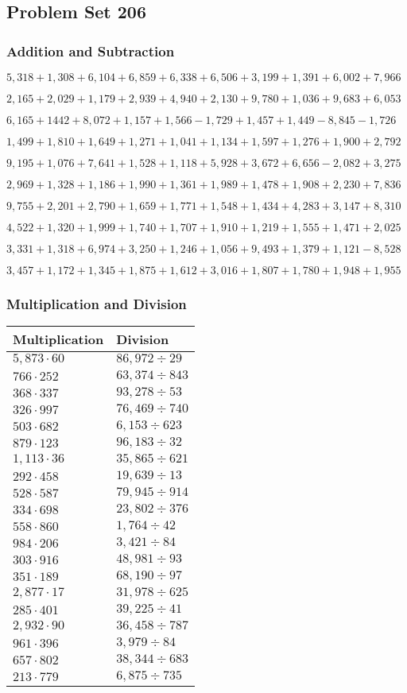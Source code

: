 \hypertarget{problem-set-206}{%
\subsection{Problem Set 206}\label{problem-set-206}}

\hypertarget{addition-and-subtraction}{%
\subsubsection{Addition and
Subtraction}\label{addition-and-subtraction}}

\(5,318+1,308+6,104+6,859+6,338+6,506+3,199+1,391+6,002+7,966\)

\(2,165+2,029+1,179+2,939+4,940+2,130+9,780+1,036+9,683+6,053\)

\(6,165+1442+8,072+1,157+1,566-1,729+1,457+1,449-8,845-1,726\)

\(1,499+1,810+1,649+1,271+1,041+1,134+1,597+1,276+1,900+2,792\)

\(9,195+1,076+7,641+1,528+1,118+5,928+3,672+6,656-2,082+3,275\)

\(2,969+1,328+1,186+1,990+1,361+1,989+1,478+1,908+2,230+7,836\)

\(9,755+2,201+2,790+1,659+1,771+1,548+1,434+4,283+3,147+8,310\)

\(4,522+1,320+1,999+1,740+1,707+1,910+1,219+1,555+1,471+2,025\)

\(3,331+1,318+6,974+3,250+1,246+1,056+9,493+1,379+1,121-8,528\)

\(3,457+1,172+1,345+1,875+1,612+3,016+1,807+1,780+1,948+1,955\)

\hypertarget{multiplication-and-division}{%
\subsubsection{Multiplication and
Division}\label{multiplication-and-division}}

\begin{longtable}[]{@{}ll@{}}
\toprule
Multiplication & Division\tabularnewline
\midrule
\endhead
\(5,873\cdot60\) & \(86,972÷29\)\tabularnewline
\(766\cdot252\) & \(63,374÷843\)\tabularnewline
\(368\cdot337\) & \(93,278÷53\)\tabularnewline
\(326\cdot997\) & \(76,469÷740\)\tabularnewline
\(503\cdot682\) & \(6,153÷623\)\tabularnewline
\(879\cdot123\) & \(96,183÷32\)\tabularnewline
\(1,113\cdot36\) & \(35,865÷621\)\tabularnewline
\(292\cdot458\) & \(19,639÷13\)\tabularnewline
\(528\cdot587\) & \(79,945÷914\)\tabularnewline
\(334\cdot698\) & \(23,802÷376\)\tabularnewline
\(558\cdot860\) & \(1,764÷42\)\tabularnewline
\(984\cdot206\) & \(3,421÷84\)\tabularnewline
\(303\cdot916\) & \(48,981÷93\)\tabularnewline
\(351\cdot189\) & \(68,190÷97\)\tabularnewline
\(2,877\cdot17\) & \(31,978÷625\)\tabularnewline
\(285\cdot401\) & \(39,225÷41\)\tabularnewline
\(2,932\cdot90\) & \(36,458÷787\)\tabularnewline
\(961\cdot396\) & \(3,979÷84\)\tabularnewline
\(657\cdot802\) & \(38,344÷683\)\tabularnewline
\(213\cdot779\) & \(6,875÷735\)\tabularnewline
\bottomrule
\end{longtable}
